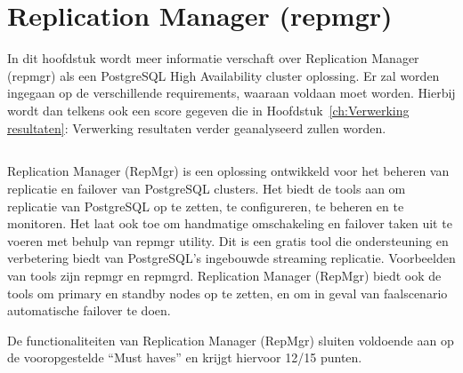 
\chapter{Replication Manager (repmgr)}
\label{ch:Replication Manager (repmgr)}

In dit hoofdstuk wordt meer informatie verschaft over Replication Manager (repmgr) als een PostgreSQL High Availability cluster oplossing. Er zal worden ingegaan op de verschillende requirements, waaraan voldaan moet worden. Hierbij wordt dan telkens ook een score gegeven die in Hoofdstuk~\ref{ch:Verwerking resultaten}: Verwerking resultaten verder geanalyseerd zullen worden.

\section{}
\label{sec:Inleiding tot Replication Manager (repmgr)}

\section{}
\label{sec:Requirements}

\subsection{}
\label{subsec:Must have}

Replication Manager (RepMgr) is een oplossing ontwikkeld voor het beheren van replicatie en failover van PostgreSQL clusters. Het biedt de tools aan om replicatie van PostgreSQL op te zetten, te configureren, te beheren en te monitoren. Het laat ook toe om handmatige omschakeling en failover taken uit te voeren met behulp van repmgr utility. Dit is een gratis tool die ondersteuning en verbetering biedt van PostgreSQL's ingebouwde streaming replicatie.
Voorbeelden van tools zijn repmgr en repmgrd.
Replication Manager (RepMgr) biedt ook de tools om primary en standby nodes op te zetten, en om in geval van faalscenario automatische failover te doen.

De functionaliteiten van Replication Manager (RepMgr) sluiten voldoende aan op de vooropgestelde “Must haves” en krijgt hiervoor 12/15 punten.

